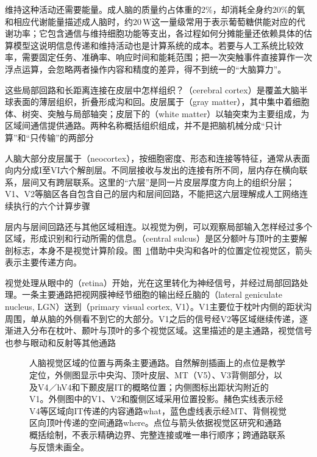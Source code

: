 维持这种活动还需要能量。成人脑的质量约占体重的$2\%$，却消耗全身约$20\%$的氧和相应代谢能量描述成人脑时，约$20\,\mathrm{W}$这一量级常用于表示葡萄糖供能对应的代谢功率；它包含通信与维持细胞功能等支出，各过程如何分摊能量还依赖具体的估算模型这说明信息传递和维持活动也是计算系统的成本。若要与人工系统比较效率，需要固定任务、准确率、响应时间和能耗范围；把一次突触事件直接算作一次浮点运算，会忽略两者操作内容和精度的差异，得不到统一的“大脑算力”。

\FloatBarrier
这些局部回路和长距离连接在皮层中怎样组织？（cerebral cortex）是覆盖大脑半球表面的薄层组织，折叠形成沟和回。皮层属于（gray matter），其中集中着细胞体、树突、突触与局部轴突；皮层下的（white matter）以轴突束为主要组成，为区域间通信提供通路。两种名称概括组织组成，并不是把脑机械分成“只计算”和“只传输”的两部分

人脑大部分皮层属于（neocortex），按细胞密度、形态和连接等特征，通常从表面向内分成I至VI六个解剖层。不同层接收与发出的连接有所不同，层内存在横向联系，层间又有跨层联系。这里的“六层”是同一片皮层厚度方向上的组织分层；V1、V2等脑区各自包含自己的层内和层间回路，不能把这六层理解成人工网络连续执行的六个计算步骤

层内与层间回路还与其他区域相连。以视觉为例，可以观察局部输入怎样经过多个区域，形成识别和行动所需的信息。（central sulcus）是区分额叶与顶叶的主要解剖标志，本身不是视觉计算阶段。图~\ref{fig:neural-visual-pathways}借助中央沟和各叶的位置定位视觉区，箭头表示主要传递方向。

视觉处理从眼中的（retina）开始，光在这里转化为神经信号，并经过局部回路处理。一条主要通路把视网膜神经节细胞的输出经丘脑的（lateral geniculate nucleus, LGN）送到（primary visual cortex, V1）。V1主要位于枕叶内侧的距状沟周围，单从脑的外侧看不到它的大部分。V1之后的信号经V2等区域继续传递，逐渐进入分布在枕叶、颞叶与顶叶的多个视觉区域。这里描述的是主通路，视觉信号也参与眼动和反射等其他通路

\begin{figure}[!t]
  \centering
  \resizebox{\linewidth}{!}{}
  \caption{人脑视觉区域的位置与两条主要通路。自然解剖插画上的点位是教学定位，外侧图显示中央沟、顶叶皮层、MT（V5）、V3背侧部分，以及V4／hV4和下颞皮层IT的概略位置；内侧图标出距状沟附近的V1。外侧图中的V1、V2和腹侧区域采用位置投影。赭色实线表示经V4等区域向IT传递的内容通路what，蓝色虚线表示经MT、背侧视觉区向顶叶传递的空间通路where。点位与箭头依据视觉区研究和通路概括绘制，不表示精确边界、完整连接或唯一串行顺序；跨通路联系与反馈未画全。}
  \label{fig:neural-visual-pathways}
\end{figure}

